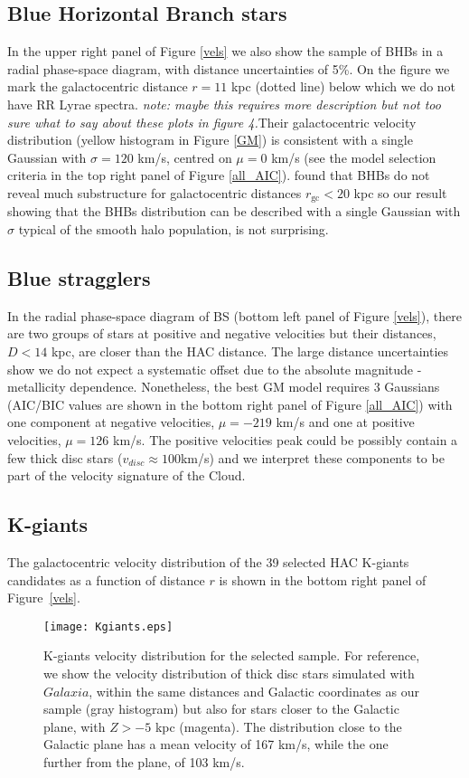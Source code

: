 \documentclass[useAMS,usenatbib]{mn2e}
\begin{document}
\subsection{Blue Horizontal Branch stars}
In the upper right panel of Figure \ref{vels} we also show the sample of BHBs in a radial phase-space diagram, with distance uncertainties of 5\%. On the figure we mark the galactocentric distance $r = 11$ kpc (dotted line) below which we do not have RR Lyrae spectra. \textit{note: maybe this requires more description but not too sure what to say about these plots in figure 4.}Their galactocentric velocity distribution (yellow histogram in Figure \ref{GM}) is consistent with a single Gaussian with $\sigma = 120$ km/s, centred on $\mu = 0$ km/s (see the model selection criteria in the top right panel of Figure \ref{all_AIC}). \citealt{Xu11} found that BHBs do not reveal much substructure for galactocentric distances $r_{\mathrm{gc}} < 20$ kpc so our result showing that the BHBs distribution can be described with a single Gaussian with $\sigma$ typical of the smooth halo population, is not surprising.

\subsection{Blue stragglers}
In the radial phase-space diagram of BS (bottom left panel of Figure \ref{vels}), there are two groups of stars at positive and negative velocities but their distances, $D < 14$ kpc, are closer than the HAC distance. The large distance uncertainties show we do not expect a systematic offset due to the absolute magnitude - metallicity dependence. Nonetheless, the best GM model requires 3 Gaussians (AIC/BIC values are shown in the bottom right panel of Figure \ref{all_AIC}) with one component at negative velocities, $\mu = -219$ km/s and one at positive velocities, $\mu=126$ km/s. The positive velocities peak could be possibly contain a few thick disc stars ($v_{disc}\approx100$km/s) and we interpret these components to be part of the velocity signature of the Cloud.

\subsection{K-giants}
The galactocentric velocity distribution of the 39 selected HAC K-giants candidates as a function of distance $r$ is shown in the bottom right panel of Figure~\ref{vels}.
\begin{figure}
\centering
\texttt{[image: Kgiants.eps]}
\caption{K-giants velocity distribution for the selected sample. For reference, we show the velocity distribution of thick disc stars simulated with $Galaxia$, within the same distances and Galactic coordinates as our sample (gray histogram) but also for stars closer to the Galactic plane, with $Z>-5$ kpc (magenta). The distribution close to the Galactic plane has a mean velocity of 167 km/s, while the one further from the plane, of 103 km/s.}
\label{Kdisc}
\end{figure}
\end{document}

